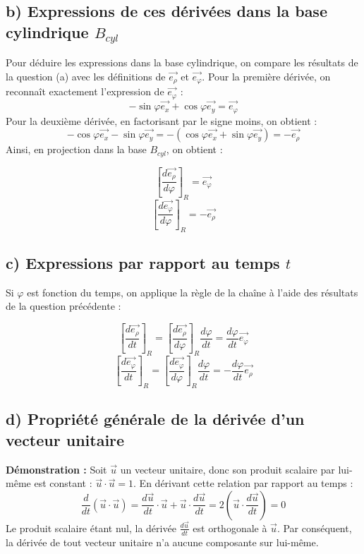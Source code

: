 \documentclass[11pt,a4paper]{article}
\begin{document}
\subsection*{b) Expressions de ces dérivées dans la base cylindrique $B_{cyl}$}
Pour déduire les expressions dans la base cylindrique, on compare les résultats de la question (a) avec les définitions de $\vec{e_\rho}$ et $\vec{e_\varphi}$.
Pour la première dérivée, on reconnaît exactement l'expression de $\vec{e_\varphi}$ :
$$ -\sin\varphi \vec{e_x} + \cos\varphi \vec{e_y} = \vec{e_\varphi} $$
Pour la deuxième dérivée, en factorisant par le signe moins, on obtient :
$$ -\cos\varphi \vec{e_x} - \sin\varphi \vec{e_y} = -(\cos\varphi \vec{e_x} + \sin\varphi \vec{e_y}) = -\vec{e_\rho} $$
Ainsi, en projection dans la base $B_{cyl}$, on obtient :
\begin{sonucbox}
$$ \left[\frac{d\vec{e_\rho}}{d\varphi}\right]_R = \vec{e_\varphi} $$
$$ \left[\frac{d\vec{e_\varphi}}{d\varphi}\right]_R = -\vec{e_\rho} $$
\end{sonucbox}

\subsection*{c) Expressions par rapport au temps $t$}
Si $\varphi$ est fonction du temps, on applique la règle de la chaîne à l'aide des résultats de la question précédente :
\begin{sonucbox}
$$ \left[\frac{d\vec{e_\rho}}{dt}\right]_R = \left[\frac{d\vec{e_\rho}}{d\varphi}\right]_R \frac{d\varphi}{dt} = \frac{d\varphi}{dt} \vec{e_\varphi} $$
$$ \left[\frac{d\vec{e_\varphi}}{dt}\right]_R = \left[\frac{d\vec{e_\varphi}}{d\varphi}\right]_R \frac{d\varphi}{dt} = -\frac{d\varphi}{dt} \vec{e_\rho} $$
\end{sonucbox}

\subsection*{d) Propriété générale de la dérivée d'un vecteur unitaire}
\textbf{Démonstration :} Soit $\vec{u}$ un vecteur unitaire, donc son produit scalaire par lui-même est constant : $\vec{u} \cdot \vec{u} = 1$.
En dérivant cette relation par rapport au temps :
$$ \frac{d}{dt} (\vec{u} \cdot \vec{u}) = \frac{d\vec{u}}{dt} \cdot \vec{u} + \vec{u} \cdot \frac{d\vec{u}}{dt} = 2 \left( \vec{u} \cdot \frac{d\vec{u}}{dt} \right) = 0 $$
Le produit scalaire étant nul, la dérivée $\frac{d\vec{u}}{dt}$ est orthogonale à $\vec{u}$. Par conséquent, la dérivée de tout vecteur unitaire n'a aucune composante sur lui-même.
\end{document}
